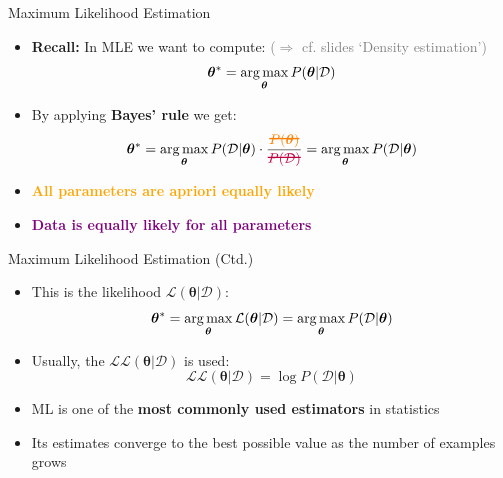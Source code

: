 \begin{frame}{Maximum Likelihood Estimation}{}
	\begin{itemize}
		\item \textbf{Recall:} In MLE we want to compute: \textcolor{gray}{($\Rightarrow$ cf. slides `Density estimation')}
		\begin{equation*}
			\bm{\theta}^* = \operatorname*{arg\,max}_{\bm{\theta}} P(\bm{\theta} \vert \mathcal{D})
		\end{equation*}
		\item By applying \textbf{Bayes' rule} we get:
		\begin{equation*}
			\bm{\theta}^* = \argmax_{\bm{\theta}} P(\mathcal{D} \vert \bm{\theta})
				\cdot \frac{
					\textcolor{orange}{\hcancel[orange]{P(\bm{\theta})}}
				}{
					\textcolor{purple}{\hcancel[purple]{P(\mathcal{D})}}
				} = \argmax_{\bm{\theta}} P(\mathcal{D} \vert \bm{\theta})
		\end{equation*}
		\item \textcolor{orange}{\textbf{All parameters are apriori equally likely}}
		\item \textcolor{purple}{\textbf{Data is equally likely for all parameters}}
	\end{itemize}
\end{frame}


\begin{frame}{Maximum Likelihood Estimation (Ctd.)}{}
	\begin{itemize}
		\item This is the likelihood $\mathcal{L}(\bm{\theta} \vert \mathcal{D})$:
		\begin{equation*}
			\bm{\theta}^* = \operatorname*{arg\,max}_{\bm{\theta}} \mathcal{L}(\bm{\theta} \vert \mathcal{D}) =
				\operatorname*{arg\,max}_{\bm{\theta}} P(\mathcal{D} \vert \bm{\theta})
		\end{equation*}
		\item Usually, the  $\mathcal{L}\mathcal{L}(\bm{\theta} \vert \mathcal{D})$ is used:
		\begin{equation*}
			\mathcal{L}\mathcal{L}(\bm{\theta} \vert \mathcal{D}) = \log P(\mathcal{D} \vert \bm{\theta})
		\end{equation*}
		\item ML is one of the \textbf{most commonly used estimators} in statistics
		\item Its estimates converge to the best possible value as the number of examples grows
	\end{itemize}
\end{frame}


